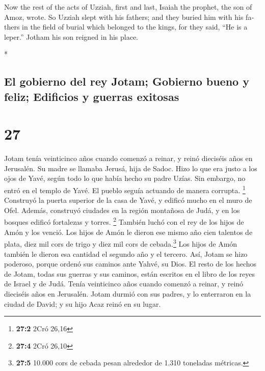 \begin{paracol}{2}
\begin{otherlanguage}{english}
 Now the rest of the acts of Uzziah, first and last,
Isaiah the prophet, the son of Amoz, wrote.  So Uzziah
slept with his fathers; and they buried him with his fathers in the
field of burial which belonged to the kings, for they said, ``He is a
leper.'' Jotham his son reigned in his place.

\end{otherlanguage}

\switchcolumn[0]*

\hypertarget{el-gobierno-del-rey-jotam-gobierno-bueno-y-feliz-edificios-y-guerras-exitosas}{%
\subsection{El gobierno del rey Jotam; Gobierno bueno y feliz; Edificios
y guerras
exitosas}\label{el-gobierno-del-rey-jotam-gobierno-bueno-y-feliz-edificios-y-guerras-exitosas}}

\hypertarget{section-52}{%
\section{27}\label{section-52}}

 Jotam tenía veinticinco años cuando comenzó a reinar, y
reinó dieciséis años en Jerusalén. Su madre se llamaba Jerusá, hija de
Sadoc.  Hizo lo que era justo a los ojos de Yavé, según
todo lo que había hecho su padre Uzías. Sin embargo, no entró en el
templo de Yavé. El pueblo seguía actuando de manera corrupta.
\footnote{\textbf{27:2} 2Cró 26,16}  Construyó la puerta
superior de la casa de Yavé, y edificó mucho en el muro de Ofel.
 Además, construyó ciudades en la región montañosa de
Judá, y en los bosques edificó fortalezas y torres. \footnote{\textbf{27:4}
  2Cró 26,10}  También luchó con el rey de los hijos de
Amón y los venció. Los hijos de Amón le dieron ese mismo año cien
talentos de plata, diez mil cors de trigo y diez mil cors de
cebada.\footnote{\textbf{27:5} 10.000 cors de cebada pesan alrededor de
  1.310 toneladas métricas.} Los hijos de Amón también le dieron esa
cantidad el segundo año y el tercero.  Así, Jotam se hizo
poderoso, porque ordenó sus caminos ante Yahvé, su Dios. 
El resto de los hechos de Jotam, todas sus guerras y sus caminos, están
escritos en el libro de los reyes de Israel y de Judá. 
Tenía veinticinco años cuando comenzó a reinar, y reinó dieciséis años
en Jerusalén.  Jotam durmió con sus padres, y lo
enterraron en la ciudad de David; y su hijo Acaz reinó en su lugar.


\end{paracol}
